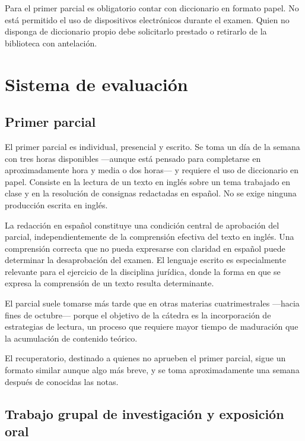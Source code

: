 \documentclass[12pt,oneside]{book}
\begin{document}
\begin{important}
Para el primer parcial es obligatorio contar con diccionario en formato papel. No está permitido el uso de dispositivos electrónicos durante el examen. Quien no disponga de diccionario propio debe solicitarlo prestado o retirarlo de la biblioteca con antelación.
\end{important}

\section{Sistema de evaluación}
\label{sec:evaluacion}

\subsection{Primer parcial}

El primer parcial es individual, presencial y escrito. Se toma un día de la semana con tres horas disponibles ---aunque está pensado para completarse en aproximadamente hora y media o dos horas--- y requiere el uso de diccionario en papel. Consiste en la lectura de un texto en inglés sobre un tema trabajado en clase y en la resolución de consignas redactadas en español. No se exige ninguna producción escrita en inglés.

\begin{important}
La redacción en español constituye una condición central de aprobación del parcial, independientemente de la comprensión efectiva del texto en inglés. Una comprensión correcta que no pueda expresarse con claridad en español puede determinar la desaprobación del examen. El lenguaje escrito es especialmente relevante para el ejercicio de la disciplina jurídica, donde la forma en que se expresa la comprensión de un texto resulta determinante.
\end{important}

El parcial suele tomarse más tarde que en otras materias cuatrimestrales ---hacia fines de octubre--- porque el objetivo de la cátedra es la incorporación de estrategias de lectura, un proceso que requiere mayor tiempo de maduración que la acumulación de contenido teórico.

El recuperatorio, destinado a quienes no aprueben el primer parcial, sigue un formato similar aunque algo más breve, y se toma aproximadamente una semana después de conocidas las notas.

\subsection{Trabajo grupal de investigación y exposición oral}
\end{document}
